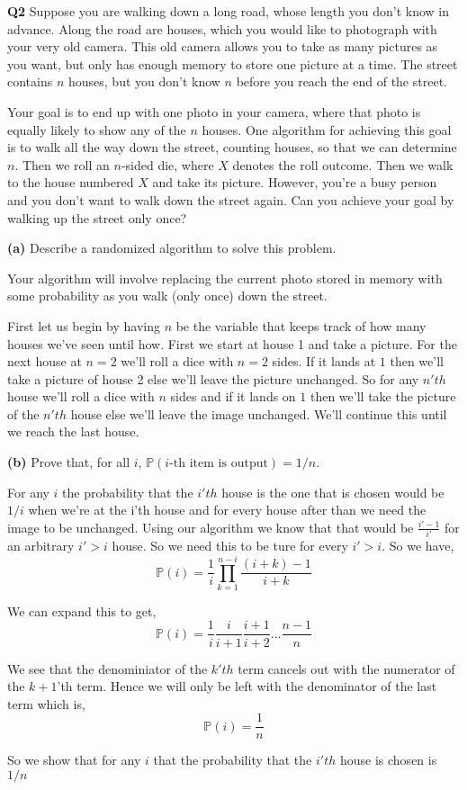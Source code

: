 \documentclass[12pt]{article}
\newcommand{\question}[3][Q]{
\begin{description}
\item \textbf{#1{#2}} #3
\end{description}
}
\newcommand{\hint}[1]{{\footnotesize
    \begin{description}
    [leftmargin=3.3em,style=nextline]
        \item[Hint:] {#1}
    \end{description}}   
}
\renewcommand{\P}{\mathbb{P}}
\begin{document}
\newpage 
\question{2}{
    Suppose you are walking down a long road, whose length you don’t know in advance. Along the road are houses, which you would like to photograph with your very old camera. This old camera allows you to take as many pictures as you want, but only has enough memory to store one picture at a time. The street contains $n$ houses, but you don’t know $n$ before you reach the end of the street.

    Your goal is to end up with one photo in your camera, where that photo is equally likely to show any of the $n$ houses. One algorithm for achieving this goal is to walk all the way down the street, counting houses, so that we can determine $n$. Then we roll an $n$-sided die, where $X$ denotes the roll outcome. Then we walk to the house numbered $X$ and take its picture. However, you’re a busy person and you don’t want to walk down the street again. Can you achieve your goal by walking up the street only once? 

\question[]{(a)}{
    Describe a randomized algorithm to solve this problem. 
    
    \hint{Your algorithm will involve replacing the current photo stored in memory with some probability as you walk (only once) down the street.}
}
\begin{answer}
    First let us begin by having $n$ be the variable that keeps track of how many houses we've seen until how. First we start at house 1 and take a picture. For the next house at $n = 2$ we'll roll a dice with $n = 2$ sides. If it lands at $1$ then we'll take a picture of house 2 else we'll leave the picture unchanged. So for any $n'th$ house we'll roll a dice with $n$ sides and if it lands on  $1$ then we'll take the picture of the $n'th$ house else we'll leave the image unchanged. We'll continue this until we reach the last house.
\end{answer}

\question[]{(b)}{
    Prove that, for all $i$, $\P(\text{$i$-th item is output}) = 1\big/n$.
}
\begin{answer}
    For any $i$ the probability that the $i'th$ house is the one that is chosen would be $1 /i$ when we're at the i'th house and for every house after than we need the image to be unchanged. Using our algorithm we know that that would be $\frac{i' - 1}{i'}$  for an arbitrary $i' > i$ house. So we need this to be ture for every $i' > i$. So we have,  
    $$\P(i) =  \frac{1}{i} \prod_{k = 1}^{n - i} \frac{(i + k) - 1}{i + k} $$ 

    We can expand this to get,
    $$\P(i) =  \frac{1}{i} \frac{i}{i + 1} \frac{i + 1}{i + 2} \dots \frac{n - 1}{n}$$

    We see that the denominiator of the $k'th$ term cancels out with the numerator of the  $k + 1$'th term. Hence we will only be left with  the denominator of the last term which is,  
    $$ \P(i) = \frac{1}{n} $$ 

    So we show that for any $i$ that the probability that the $i'th$ house is chosen is  $1 /n$
\end{answer}
}
\end{document}
